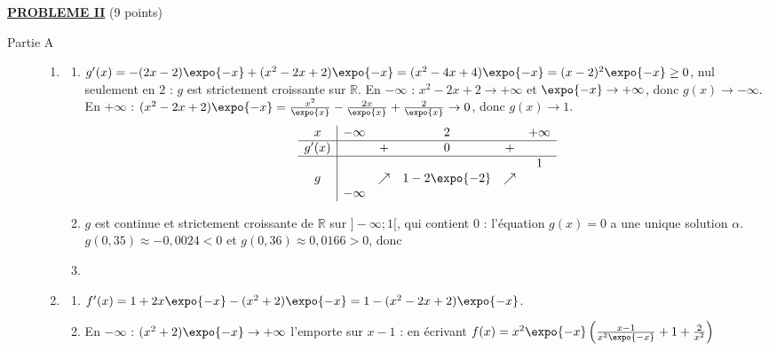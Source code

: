 \noindent \underline{\textsc{\textbf{PROBLEME II}}} (9 points)
\begin{description}
	\item[Partie A]
	\begin{enumerate}
		\item
		\begin{enumerate}
			\item {}
				$g'(x) = -(2x - 2)\expo{-x} + (x^2 - 2x + 2)\expo{-x} = (x^2 - 4x + 4)\expo{-x} = (x-2)^2\expo{-x} \geq 0$,
				nul seulement en $2$ : $g$ est strictement croissante sur $\mathbb{R}$.
				En $-\infty$ : $x^2 - 2x + 2 \to +\infty$ et $\expo{-x} \to +\infty$, donc $g(x) \to -\infty$.
				En $+\infty$ : $(x^2 - 2x + 2)\expo{-x} = \frac{x^2}{\expo{x}} - \frac{2x}{\expo{x}} + \frac{2}{\expo{x}} \to 0$, donc $g(x) \to 1$.
				\[
				\begin{array}{c|ccccc}
					x & -\infty & & 2 & & +\infty \\ \hline
					g'(x) & & + & 0 & + & \\ \hline
					 & & & & & 1 \\
					g & & \nearrow & 1 - 2\expo{-2} & \nearrow & \\
					 & -\infty & & & &
				\end{array}
				\]
			\item {}
				$g$ est continue et strictement croissante de $\mathbb{R}$ sur $]-\infty ; 1[$, qui contient $0$ : l'équation $g(x) = 0$ a une unique solution $\alpha$.
				$g(0{,}35) \approx -0{,}0024 < 0$ et $g(0{,}36) \approx 0{,}0166 > 0$, donc
				\par\noindent{}
			\item {}
		\end{enumerate}
		\item
		\begin{enumerate}
			\item {}
				$f'(x) = 1 + 2x\expo{-x} - (x^2 + 2)\expo{-x} = 1 - (x^2 - 2x + 2)\expo{-x}$.
				\par\noindent{}
			\item {}
				En $-\infty$ : $(x^2 + 2)\expo{-x} \to +\infty$ l'emporte sur $x - 1$ : en écrivant $f(x) = x^2\expo{-x}\left(\frac{x - 1}{x^2\expo{-x}} + 1 + \frac{2}{x^2}\right)$

\end{enumerate}
\end{enumerate}
\end{description}
